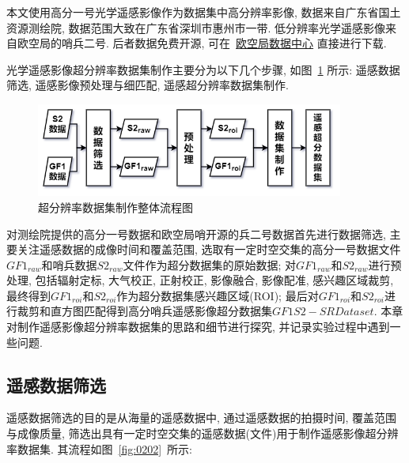 本文使用高分一号光学遥感影像作为数据集中高分辨率影像, 数据来自广东省国土资源测绘院, 数据范围大致在广东省深圳市惠州市一带. 低分辨率光学遥感影像来自欧空局的哨兵二号. 后者数据免费开源, 可在~\href{https://scihub.copernicus.eu/dhus/#/home}{欧空局数据中心} 直接进行下载. 

光学遥感影像超分辨率数据集制作主要分为以下几个步骤, 如图~\ref{fig:0201} 所示: 遥感数据筛选, 遥感影像预处理与细匹配, 遥感超分辨率数据集制作.

\begin{figure}[!htbp]
    \centering
    \includegraphics[width=0.9\textwidth]{pic/chap02-01.png}
    \caption{超分辨率数据集制作整体流程图}
    \label{fig:0201}
\end{figure}

对测绘院提供的高分一号数据和欧空局哨开源的兵二号数据首先进行数据筛选, 主要关注遥感数据的成像时间和覆盖范围, 选取有一定时空交集的高分一号数据文件$GF1_{raw}$和哨兵数据$S2_{raw}$文件作为超分数据集的原始数据; 对$GF1_{raw}$和$S2_{raw}$进行预处理, 包括辐射定标, 大气校正, 正射校正, 影像融合, 影像配准, 感兴趣区域裁剪, 最终得到$GF1_{roi}$和$S2_{roi}$作为超分数据集感兴趣区域(ROI); 最后对$GF1_{roi}$和$S2_{roi}$进行裁剪和直方图匹配得到高分哨兵遥感影像超分数据集$GF1S2-SRDataset$. 本章对制作遥感影像超分辨率数据集的思路和细节进行探究, 并记录实验过程中遇到一些问题. 

\subsection{遥感数据筛选}
遥感数据筛选的目的是从海量的遥感数据中, 通过遥感数据的拍摄时间, 覆盖范围与成像质量, 筛选出具有一定时空交集的遥感数据(文件)用于制作遥感影像超分辨率数据集. 其流程如图~\ref{fig:0202}~所示:

